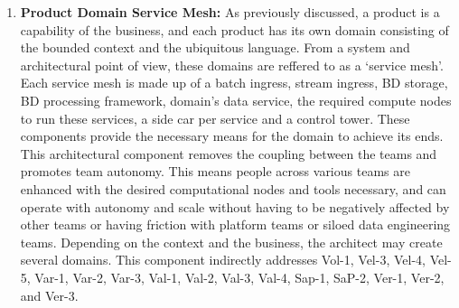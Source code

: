 \documentclass[review]{elsarticle}
\begin{document}
\begin{enumerate}
    \item \textbf{Product Domain Service Mesh:} As previously discussed, a product is a capability of the business, and each product has its own domain consisting of the bounded context and the ubiquitous language. From a system and architectural point of view, these domains are reffered to as a `service mesh'. Each service mesh is made up of a batch ingress, stream ingress, BD storage, BD processing framework, domain's data service, the required compute nodes to run these services, a side car per service and a control tower. These components provide the necessary means for the domain to achieve its ends. This architectural component removes the coupling between the teams and promotes team autonomy. This means people across various teams are enhanced with the desired computational nodes and tools necessary, and can operate with autonomy and scale without having to be negatively affected by other teams or having friction with platform teams or siloed data engineering teams. Depending on the context and the business, the architect may create several domains. This component indirectly addresses Vol-1, Vel-3, Vel-4, Vel-5, Var-1, Var-2, Var-3, Val-1, Val-2, Val-3, Val-4, Sap-1, SaP-2, Ver-1, Ver-2, and Ver-3.
    

\end{enumerate}
\end{document}
